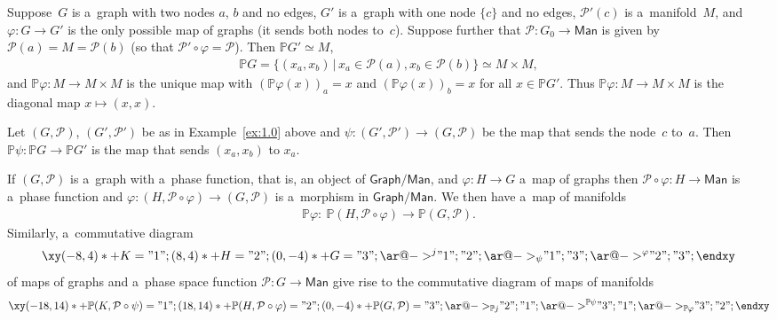 \documentclass[10pt,a4paper]{amsart}
\numberwithin{equation}{section}
\begin{document}
\begin{Example}
\label{ex:1.0}
Suppose~$G$ is a~graph with two nodes $a$, $b$ and no edges, $G'$ is a~graph with one node $\{c\}$ and no edges,
${\mathcal P}'(c)$ is a~manifold~$M$, and $\varphi\colon G\to G'$ is the only possible map of graphs (it sends both
nodes to~$c$).
Suppose further that ${\mathcal P}\colon G_0\to \mathsf{Man}$ is given by ${\mathcal P} (a) = M = {\mathcal P}(b)$ (so
that ${\mathcal P}'\circ \varphi = {\mathcal P}$).
Then $\mathbb{P} G'\simeq M$,
\begin{gather*}
\mathbb{P} G = \{(x_a, x_b) \,|\, x_a\in {\mathcal P} (a), x_b \in {\mathcal P} (b)\} \simeq M\times M,
\end{gather*}
and $\mathbb{P}\varphi\colon M\to M\times M$ is the unique map with $(\mathbb{P} \varphi (x))_a = x$ and $(\mathbb{P}
\varphi (x))_b = x$ for all $x\in \mathbb{P} G'$.
Thus $\mathbb{P} \varphi\colon M\to M\times M$ is the diagonal map $x\mapsto (x,x)$.
\end{Example}

\begin{Example}
Let $(G,{\mathcal P})$, $(G', {\mathcal P}')$ be as in Example~\ref{ex:1.0} above and $\psi\colon (G',{\mathcal P}')\to
(G,{\mathcal P})$ be the map that sends the node~$c$ to~$a$.
Then $\mathbb{P} \psi\colon \mathbb{P} G \to \mathbb{P} G'$ is the map that sends $(x_a, x_b)$ to $x_a$.
\end{Example}

\begin{Remark}
\label{rmrk:2.16}
If $(G,{\mathcal P})$ is a~graph with a~phase function, that is, an object of $\mathsf{Graph}/\mathsf{Man}$, and
$\varphi\colon H\to G$ a~map of graphs then ${\mathcal P}\circ \varphi\colon H\to \mathsf{Man}$ is a~phase function and
$\varphi\colon (H,{\mathcal P}\circ \varphi)\to (G,{\mathcal P})$ is a~morphism in $\mathsf{Graph}/\mathsf{Man}$.
We then have a~map of manifolds
\begin{gather*}
\mathbb{P} \varphi\colon \ \mathbb{P} (H, {\mathcal P}\circ \varphi)\to \mathbb{P} (G,{\mathcal P}).
\end{gather*}
Similarly, a~commutative diagram
\begin{gather*}
\xy
(-8, 4)*+{ K} ="1";
(8, 4)*+{ H} ="2";
(0, -4)*+{G}="3";
{\ar@{->}^{ j} "1";"2"};
{\ar@{->}_{ \psi} "1";"3"};
{\ar@{->}^{\varphi} "2";"3"};
\endxy
\end{gather*}
of maps of graphs and a~phase space function ${\mathcal P}\colon G\to \mathsf{Man}$ give rise to the commutative diagram
of maps of manifolds
\begin{gather*}
\xy
(-18, 14)*+{\mathbb{P} (K, {\mathcal P}\circ \psi) } ="1";
(18, 14)*+{ \mathbb{P} (H, {\mathcal P}\circ \varphi)} ="2";
(0, -4)*+{\mathbb{P}(G,{\mathcal P})}="3";
{\ar@{->}_{ \mathbb{P} j} "2";"1"};
{\ar@{->}^{ \mathbb{P} \psi} "3";"1"};
{\ar@{->}_{\mathbb{P} \varphi} "3";"2"};
\endxy
\end{gather*}

\end{Remark}
\end{document}
